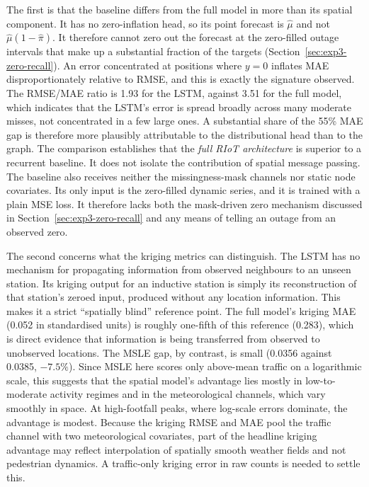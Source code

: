The first is that the baseline differs from the full model in more than
its spatial component. It has no zero-inflation head, so its point
forecast is $\hat{\mu}$ and not $\hat{\mu}(1-\hat{\pi})$. It therefore
cannot zero out the forecast at the zero-filled outage intervals that
make up a substantial fraction of the targets
(Section~\ref{sec:exp3-zero-recall}). An error concentrated at positions
where $y=0$ inflates MAE disproportionately relative to RMSE, and this is
exactly the signature observed. The RMSE/MAE ratio is 1.93 for the LSTM,
against 3.51 for the full model, which indicates that the LSTM's error
is spread broadly across many moderate misses, not concentrated in a few
large ones. A substantial share of the 55\% MAE gap is therefore more
plausibly attributable to the distributional head than to the graph. The
comparison establishes that the \emph{full RIoT architecture} is
superior to a recurrent baseline. It does not isolate the contribution
of spatial message passing. The baseline also receives neither the
missingness-mask channels nor static node covariates. Its only input is
the zero-filled dynamic series, and it is trained with a plain MSE loss.
It therefore lacks both the mask-driven zero mechanism discussed in
Section~\ref{sec:exp3-zero-recall} and any means of telling an outage
from an observed zero.

The second concerns what the kriging metrics can distinguish. The LSTM
has no mechanism for propagating information from observed neighbours
to an unseen station. Its kriging output for an inductive station is
simply its reconstruction of that station's zeroed input, produced
without any location information. This makes it a strict ``spatially
blind'' reference point. The
full model's kriging MAE (0.052 in standardised units) is roughly
one-fifth of this reference (0.283), which is direct evidence that
information is being transferred from observed to unobserved locations.
The MSLE gap, by contrast, is small (0.0356 against 0.0385, $-7.5\%$).
Since MSLE here scores only above-mean traffic on a logarithmic scale,
this suggests that the spatial model's advantage lies mostly in
low-to-moderate activity regimes and in the meteorological channels,
which vary smoothly in space. At high-footfall peaks, where log-scale
errors dominate, the advantage is modest. Because the kriging RMSE and
MAE pool the traffic channel with two meteorological covariates, part
of the headline kriging advantage may reflect interpolation of spatially
smooth weather fields and not pedestrian dynamics. A traffic-only
kriging error in raw counts is needed to settle this.

